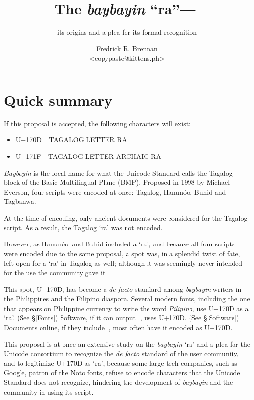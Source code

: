 \documentclass[a4paper,pagesize,openany,14pt,parskip=never]{scrbook}
\title{The {\em baybayin} ``ra''---{\baybayin ᜍ}}
\author{Fredrick R. Brennan \\ <copypaste@kittens.ph>}
\subtitle{its origins and a plea for its formal recognition}
\newcommand{\≈}{$\approx$}
\newcommand{\ra}{{\baybayin ᜍ}}
\newcommand{\hanunoo}{Hanun\'o\textquotesingle o}
\begin{document}
\maketitle

\section*{Quick summary}
If this proposal is accepted, the following characters will exist:

\begin{itemize}
    \item U+170D {\Huge \ra}\ \textsf{TAGALOG LETTER RA}
    \item U+171F {\Huge\baybayinh ᜍ}\ \textsf{TAGALOG LETTER ARCHAIC RA}
\end{itemize}

\tableofcontents

{\em Baybayin} is the local name for what the Unicode Standard calls the Tagalog block of the Basic Multilingual Plane (BMP). Proposed in 1998 by Michael Everson, four scripts were encoded at once: Tagalog, \hanunoo, Buhid and Tagbanwa.

At the time of encoding, only ancient documents were considered for the Tagalog script. As a result, the Tagalog `ra' was not encoded. 

However, as \hanunoo\ and Buhid included a `ra', and because all four scripts were encoded due to the same proposal, a spot was, in a splendid twist of fate, left open for a `ra' in Tagalog as well; although it was seemingly never intended for the use the community gave it.

This spot, U+170D, has become a {\em de facto} standard among {\em baybayin} writers in the Philippines and the Filipino diaspora. Several modern fonts, including the one that appears on Philippine currency to write the word {\em Pilipino}, use U+170D as a `ra'. (See \S\ref{Fonts}) Software, if it can output \ra, uses U+170D. (See \S\ref{Software}) Documents online, if they include \ra, most often have it encoded as U+170D.

This proposal is at once an extensive study on the {\em baybayin} `ra' and a plea for the Unicode consortium to recognize the {\em de facto} standard of the user community, and to legitimize U+170D as `ra', because some large tech companies, such as Google, patron of the Noto fonts, refuse to encode characters that the Unicode Standard does not recognize, hindering the development of {\em baybayin} and the community in using its script.
\end{document}
